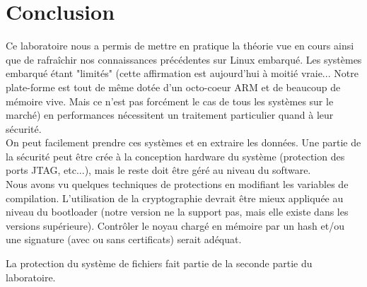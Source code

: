 
\chapter{Conclusion} %

\label{Conclusion} %



Ce laboratoire nous a permis de mettre en pratique la théorie vue en cours ainsi que de rafraîchir nos connaissances précédentes sur Linux embarqué. Les systèmes embarqué étant "limités" (cette affirmation est aujourd'hui à moitié vraie... Notre plate-forme est tout de même dotée d'un octo-coeur ARM et de beaucoup de mémoire vive. Mais ce n'est pas forcément le cas de tous les systèmes sur le marché) en performances nécessitent un traitement particulier quand à leur sécurité.\\ 

On peut facilement prendre ces systèmes et en extraire les données. Une partie de la sécurité peut être crée à la conception hardware du système (protection des ports JTAG, etc...), mais le reste doit être géré au niveau du software. \\

Nous avons vu quelques techniques de protections en modifiant les variables de compilation. L'utilisation de la cryptographie devrait être mieux appliquée au niveau du bootloader (notre version ne la support pas, mais elle existe dans les versions supérieure). Contrôler le noyau chargé en mémoire par un hash et/ou une signature (avec ou sans certificats) serait adéquat.    

La protection du système de fichiers fait partie de la seconde partie du laboratoire.